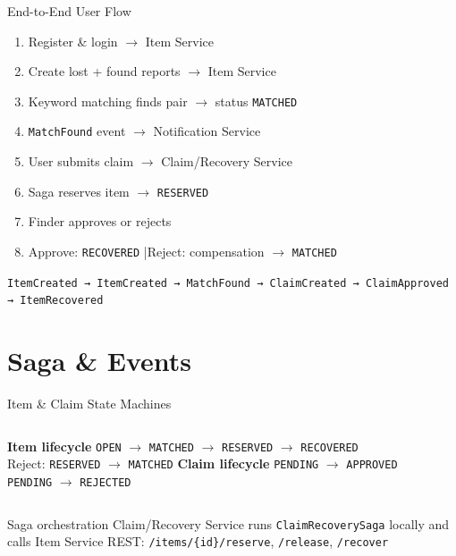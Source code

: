 \documentclass[11pt,aspectratio=169]{beamer}
\begin{document}
\begin{frame}{End-to-End User Flow}
  \begin{enumerate}
    \item Register \& login \hfill $\rightarrow$ Item Service
    \item Create lost + found reports \hfill $\rightarrow$ Item Service
    \item Keyword matching finds pair \hfill $\rightarrow$ status \texttt{MATCHED}
    \item \texttt{MatchFound} event \hfill $\rightarrow$ Notification Service
    \item User submits claim \hfill $\rightarrow$ Claim/Recovery Service
    \item Saga reserves item \hfill $\rightarrow$ \texttt{RESERVED}
    \item Finder approves or rejects
    \item Approve: \texttt{RECOVERED} \quad|\quad Reject: compensation $\rightarrow$ \texttt{MATCHED}
  \end{enumerate}
  \vspace{0.3cm}
  \centering\small\texttt{ItemCreated → ItemCreated → MatchFound → ClaimCreated → ClaimApproved → ItemRecovered}
\end{frame}

\section{Saga \& Events}

\begin{frame}{Item \& Claim State Machines}
  \begin{columns}[T]
    \textbf{Item lifecycle}
    \vspace{0.2cm}
    \centering\small
    \texttt{OPEN} $\rightarrow$ \texttt{MATCHED} $\rightarrow$ \texttt{RESERVED} $\rightarrow$ \texttt{RECOVERED}\\
    \vspace{0.2cm}
    Reject: \texttt{RESERVED} $\rightarrow$ \texttt{MATCHED}
    \textbf{Claim lifecycle}
    \vspace{0.2cm}
    \centering\small
    \texttt{PENDING} $\rightarrow$ \texttt{APPROVED}\\
    \texttt{PENDING} $\rightarrow$ \texttt{REJECTED}
  \end{columns}
  \vspace{0.5cm}
  \begin{block}{Saga orchestration}
    Claim/Recovery Service runs \texttt{ClaimRecoverySaga} locally and calls Item Service REST:
    \texttt{/items/\{id\}/reserve}, \texttt{/release}, \texttt{/recover}
  \end{block}
\end{frame}
\end{document}
